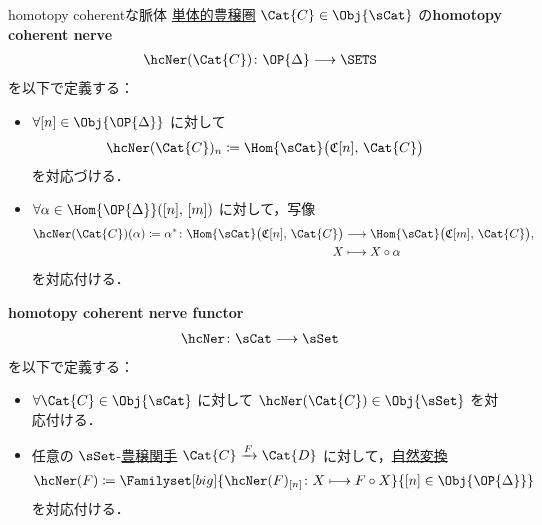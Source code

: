 \documentclass[TQFT_main]{subfiles}
\begin{document}
\begin{mydef}[label=def:nerve-hc,breakable]{homotopy coherentな脈体}
    \hyperref[def:SimpCat]{単体的豊穣圏} $\Cat{C} \in \Obj{\sCat}$ の\textbf{homotopy coherent nerve}
    \begin{align}
        \hcNer (\Cat{C}) \colon \OP{\Delta} \lto \SETS
    \end{align}
    を以下で定義する：
    \begin{itemize}
        \item $\forall [n] \in \Obj{\OP{\Delta}}$ に対して
        \begin{align}
            \hcNer (\Cat{C})_n &\coloneqq \Hom{\sCat} \bigl( \mathfrak{C}[n],\, \Cat{C} \bigr) 
        \end{align}
        を対応づける．
        \item $\forall \alpha \in \Hom{\OP{\Delta}}([n],\, [m])$ に対して，写像
        \begin{align}
            \hcNer (\Cat{C})(\alpha) \coloneqq \alpha^* \colon \Hom{\sCat} \bigl( \mathfrak{C}[n],\, \Cat{C} \bigr) &\lto \Hom{\sCat} \bigl( \mathfrak{C}[m],\, \Cat{C} \bigr), \\
            X &\lmto X \circ \alpha
        \end{align}
        を対応付ける．
    \end{itemize}
    
    \tcblower

    \textbf{homotopy coherent nerve functor}
    \begin{align}
        \hcNer  \colon \sCat \lto \sSet
    \end{align}
    を以下で定義する：
    \begin{itemize}
        \item $\forall \Cat{C} \in \Obj{\sCat}$ に対して $\hcNer (\Cat{C}) \in \Obj{\sSet}$ を対応付ける．
        \item 任意の $\sSet$-\hyperref[def:enriched-functor]{豊穣関手} $\Cat{C} \xrightarrow{F} \Cat{D}$ に対して，\hyperref[def:nat]{自然変換}
        \begin{align}
            \hcNer  (F) \coloneqq \Familyset[big]{\hcNer (F)_{[n]} \colon X \lmto F \circ X}{[n] \in \Obj{\OP{\Delta}}}
        \end{align}
        を対応付ける．
    \end{itemize}
\end{mydef}
\end{document}
